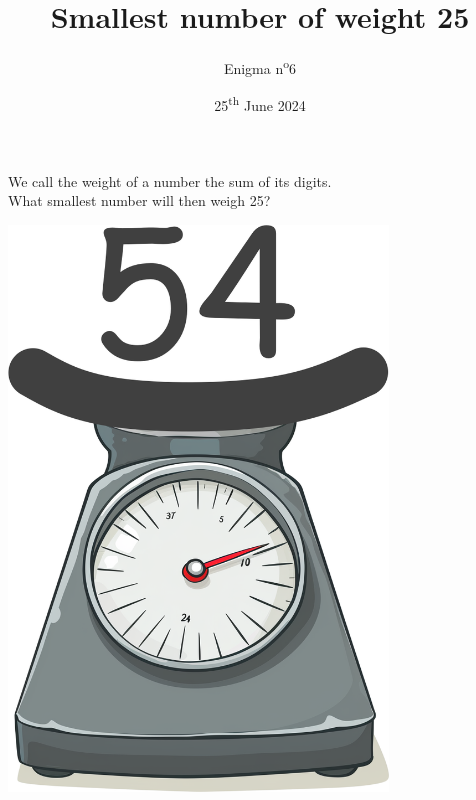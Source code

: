 \documentclass[a4paper, top=10mm]{article}
\title{\textbf{\huge{Smallest number of weight 25}}}
\author{Enigma n\textsuperscript{o}6}
\date{25\textsuperscript{th} June 2024}
\begin{document}
	\maketitle
	
	\Large
	We call the weight of a number the sum of its digits.\\
	What smallest number will then weigh 25?
	
	\vspace{2cm}
	
	\begin{center}
		\includegraphics[height=15cm]{06weight_scale.png}
	\end{center}
	
	
\end{document}

